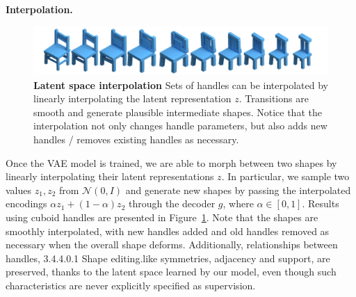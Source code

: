 \vspace{5pt}
\noindent\textbf{Interpolation.}
\begin{figure}
\centering
\includegraphics[width=1.0\linewidth]{handles/imgs/interpolation.png}
\vspace{-20pt}
\caption{\label{hand:interp} \small
\textbf{Latent space interpolation}
Sets of handles can be interpolated by linearly interpolating
the latent representation $z$.
Transitions are smooth and generate plausible intermediate shapes.
Notice that the interpolation not only changes handle parameters, but also
adds new handles / removes existing handles as necessary.
}
\vspace{-15pt}
\end{figure}
Once the VAE model is trained, we are able to morph between two shapes by 
linearly interpolating their latent representations $z$.
In particular, we sample two values $z_1, z_2$ from $\mathcal{N}(0, I)$ and generate new shapes by passing the interpolated encodings $\alpha z_1 + (1-\alpha) z_2$ through the decoder $g$,
where $\alpha \in [0, 1]$.
Results using cuboid handles are presented in Figure~\ref{hand:interp}.
Note that the shapes are smoothly interpolated, with new handles added and old handles removed as necessary when the overall shape deforms.
Additionally, relationships between handles, 3.4.4.0.1    Shape editing.like symmetries, adjacency and support, are
preserved, thanks to the latent space learned by our model, even though such characteristics are never explicitly specified as supervision.

